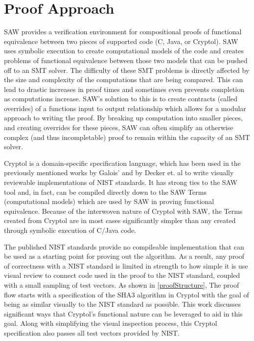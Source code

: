 
\section{Proof Approach}\label{sec:proof}


SAW provides a verification environment for compositional proofs of functional equivalence between two pieces of supported code (C, Java, or Cryptol).  
SAW uses symbolic execution to create computational models of the code and creates problems of functional equivalence between those two models that can be pushed off to an SMT solver.  
The difficulty of these SMT problems is directly affected by the size and complexity of the computations that are being compared.  
This can lead to drastic increases in proof times and sometimes even prevents completion as computations increase.  
SAW's solution to this is to create contracts (called overrides) of a functions input to output relationship which allows for a modular approach to writing the proof.  
By breaking up computation into smaller pieces, and creating overrides for these pieces, SAW can often simplify an otherwise complex (and thus incompletable) proof to remain within the capacity of an SMT solver.

Cryptol is a domain-specific specification language, which has been used in the previously mentioned works by Galois' and by Decker et. al to write visually reviewable implementations of NIST standards.
It has strong ties to the SAW tool and, in fact, can be compiled directly down to the SAW Terms (computational models) which are used by SAW in proving functional equivalence.
Because of the interwoven nature of Cryptol with SAW, the Terms created from Cryptol are in most cases significantly simpler than any created through symbolic execution of C/Java code.

The published NIST standards provide no compileable implementation that can be used as a starting point for proving out the algorithm.
As a result, any proof of correctness with a NIST standard is limited in strength to how simple it is use visual review to connect code used in the proof to the NIST standard, coupled with a small sampling of test vectors.
As shown in \ref{proofStructure}, The proof flow starts with a specification of the SHA3 algorithm in Cryptol with the goal of being as similar visually to the NIST standard as possible.
This work discusses significant ways that Cryptol's functional nature can be leveraged to aid in this goal.
Along with simplifying the visual inspection process, this Cryptol specification also passes all test vectors provided by NIST.

